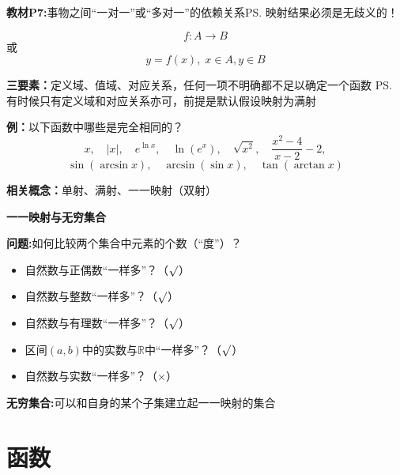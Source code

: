 {\bf 教材P7:}事物之间“一对一”或“多对一”的依赖关系\ps{映射结果必须是无歧义的！}

$$f:A\to B$$
或
$$y=f(x),\;x\in A,y\in B$$

{\bf 三要素：}定义域、值域、对应关系，任何一项不明确都不足以确定一个函数
\ps{有时候只有定义域和对应关系亦可，前提是默认假设映射为满射}

{{\bf 例：}以下函数中哪些是完全相同的？}
		$$x,\quad |x|,\quad e^{\ln x},\quad \ln(e^x),\quad \sqrt{x^2},\quad
		\frac{x^2-4}{x-2}-2,$$
		$$\sin(\arcsin x),\quad \arcsin(\sin x), \quad \tan(\arctan x)$$

{\bf 相关概念：}单射、满射、一一映射（双射）

\begin{shaded}
	{\bf 一一映射与无穷集合}
	
	{\bf 问题:}如何比较两个集合中元素的个数（“度”）？

	\begin{itemize}
	  \setlength{\itemindent}{1cm}
	  \item 自然数与正偶数“一样多”？（{$\surd$}）
	  \item 自然数与整数“一样多”？（{$\surd$}）
	  \item 自然数与有理数“一样多”？（{$\surd$}）
	  \item 区间$(a,b)$中的实数与$\mathbb{R}$中“一样多”？（{$\surd$}）
	  \item 自然数与实数“一样多”？（{$\times$}）
	\end{itemize}
		
	{\bf 无穷集合:}可以和自身的某个子集建立起一一映射的集合
\end{shaded}	

	
\section{函数}
	
